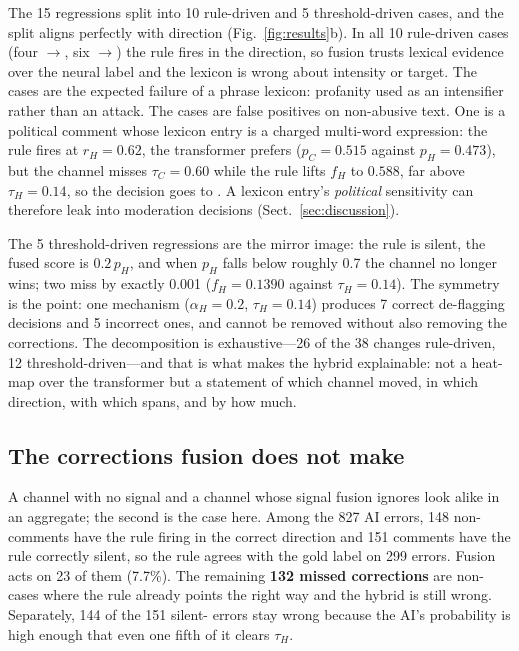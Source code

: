 The 15 regressions split into 10 rule-driven and 5 threshold-driven cases, and the
split aligns perfectly with direction (Fig.~\ref{fig:results}b). In all 10 rule-driven
cases (four
\off{}$\to$\hate{}, six \clean{}$\to$\hate{}) the rule fires in the \hate{}
direction, so fusion trusts lexical \hate{} evidence over the neural label and the
lexicon is wrong about intensity or target. The \off{} cases are the expected failure
of a phrase lexicon: profanity used as an intensifier rather than an attack. The
\clean{} cases are false positives on non-abusive text. One is a political comment
whose lexicon entry is a charged multi-word expression: the rule fires at $r_H=0.62$,
the transformer prefers \clean{} ($p_C=0.515$ against $p_H=0.473$), but the \clean{}
channel misses $\tau_C=0.60$ while the rule lifts $f_H$ to $0.588$, far above
$\tau_H=0.14$, so the decision goes to \hate{}. A lexicon entry's \emph{political}
sensitivity can therefore leak into moderation decisions
(Sect.~\ref{sec:discussion}).

The 5 threshold-driven regressions are the mirror image: the rule is silent, the
fused \hate{} score is $0.2\,p_H$, and when $p_H$ falls below roughly 0.7 the \hate{}
channel no longer wins; two miss by exactly 0.001 ($f_H=0.1390$ against
$\tau_H=0.14$). The symmetry is the point: one mechanism ($\alpha_H=0.2$,
$\tau_H=0.14$) produces 7 correct de-flagging decisions and 5 incorrect ones, and
cannot be removed without also removing the corrections. The decomposition is
exhaustive---26 of the 38 changes rule-driven, 12 threshold-driven---and that is what
makes the hybrid explainable: not a heat-map over the transformer but a statement of
which channel moved, in which direction, with which spans, and by how much.

\subsection{The corrections fusion does not make}
\label{sec:missed}

A channel with no signal and a channel whose signal fusion ignores look alike in an
aggregate; the second is the case here. Among the 827 AI errors, 148 non-\clean{}
comments have the rule firing in the correct direction and 151 \clean{} comments have
the rule correctly silent, so the rule agrees with the gold label on 299 errors.
Fusion acts on 23 of them (7.7\%). The remaining \textbf{132 missed corrections} are
non-\clean{} cases where the rule already points the right way and the hybrid is
still wrong. Separately, 144 of the 151 silent-\clean{} errors stay wrong because the
AI's \hate{} probability is high enough that even one fifth of it clears $\tau_H$.

